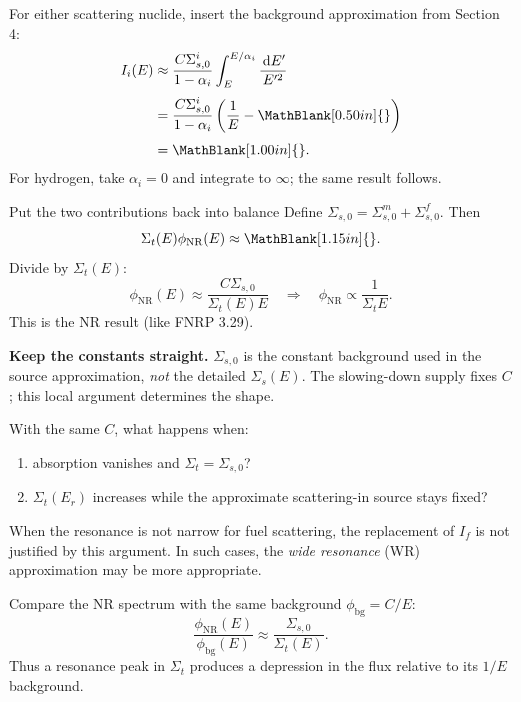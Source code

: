 \begin{handoutcolumns}
For either scattering nuclide, insert the background approximation from Section 4:
\begin{align*}
 I_i(E)
 &\approx \frac{C\Sigma_{s,0}^i}{1-\alpha_i}
    \int_E^{E/\alpha_i}\frac{\dd E'}{E'^2}\\[3pt]
 &=\frac{C\Sigma_{s,0}^i}{1-\alpha_i}
    \left(\frac{1}{E}-\MathBlank[0.50in]{}\right)\\[3pt]
 &=\MathBlank[1.00in]{}.
\end{align*}
For hydrogen, take $\alpha_i=0$ and integrate to $\infty$; the same result follows.

\begin{boardbox}{Put the two contributions back into balance}
Define $\Sigma_{s,0}=\Sigma_{s,0}^m+\Sigma_{s,0}^f$. Then
$$
 \Sigma_t(E)\phi_{\mathrm{NR}}(E)
 \approx \MathBlank[1.15in]{}.
$$
Divide by $\Sigma_t(E)$:
$$
 \boxed{\phi_{\mathrm{NR}}(E)\approx
 \frac{C\Sigma_{s,0}}{\Sigma_t(E)E}}
 \quad\Longrightarrow\quad
 \boxed{\phi_{\mathrm{NR}}\propto\frac{1}{\Sigma_t E}}.
$$
This is the NR result (like FNRP 3.29).
\end{boardbox}

\textbf{Keep the constants straight.} $\Sigma_{s,0}$ is the constant background used in the source approximation, \emph{not} the detailed $\Sigma_s(E)$. The slowing-down supply fixes $C$; this local argument determines the shape.

\begin{checkpoint}
With the same $C$, what happens when:
\begin{enumerate}
\item absorption vanishes and $\Sigma_t=\Sigma_{s,0}$?
\item $\Sigma_t(E_r)$ increases while the approximate scattering-in source stays fixed?
\end{enumerate}

\end{checkpoint}

\begin{takeawaybox}
When the resonance is not narrow for fuel scattering, the replacement of $I_f$ is not justified by this argument. In such cases, the {\it wide resonance} (WR) approximation may be more appropriate.
\end{takeawaybox}

\switchcolumn
\RaggedRight
{}
Compare the NR spectrum with the same background $\phi_{\mathrm{bg}}=C/E$:
$$
 \boxed{\frac{\phi_{\mathrm{NR}}(E)}{\phi_{\mathrm{bg}}(E)}
 \approx\frac{\Sigma_{s,0}}{\Sigma_t(E)}}.
$$
Thus a resonance peak in $\Sigma_t$ produces a depression in the flux relative to its $1/E$ background.


\end{handoutcolumns}
